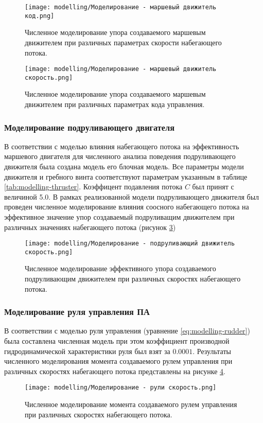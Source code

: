 \begin{figure}[ht]
    \centering
    \texttt{[image: modelling/Моделирование - маршевый движитель код.png]}
    \caption{Численное моделирование упора создаваемого маршевым движителем при различных параметрах скорости набегающего потока.}
    \label{fig:modelling-thruster-velocity}
\end{figure}

\begin{figure}[ht]
    \centering
    \texttt{[image: modelling/Моделирование - маршевый движитель скорость.png]}
    \caption{Численное моделирование упора создаваемого маршевым движителем при различных параметрах кода управления.}
    \label{fig:modelling-thruster-code}
\end{figure}

\subsubsection{Моделирование подруливающего двигателя}
В соответствии с моделью влияния набегающего потока на эффективность маршевого двигателя для численного анализа поведения подруливающего движителя была создана модель его блочная модель.
Все параметры модели движителя и гребного винта соответствуют параметрам указанным в таблице \ref{tab:modelling-thruster}.
Коэффицент подавления потока $C$ был принят с величиной 5.0.
В рамках реализованной модели подруливающего движителя был проведен численное моделирование влияния соосного набегающего потока на эффективное значение упор создаваемый подруливащим движителем при различных значениях набегающего потока (рисунок \ref{fig:modelling-tunnel-velocity})

\begin{figure}[ht]
    \centering
    \texttt{[image: modelling/Моделирование - подруливающий движитель скорость.png]}
    \caption{Численное моделирование эффективного упора создаваемого подруливающим движителем при различных скоростях набегающего потока.}
    \label{fig:modelling-tunnel-velocity}
\end{figure}

\subsubsection{Моделирование руля управления ПА}
В соответствии с моделью руля управления (уравнение \ref{eq:modelling-rudder}) была составлена численная модель при этом коэффициент производной гидродинамической характеристики руля был взят за $0.0001$.
Результаты численного моделирования момента создаваемого рулем управления при различных скоростях набегающего потока представлены на рисунке \ref{fig:modelling-rudder-velocity}.

\begin{figure}[ht]
    \centering
    \texttt{[image: modelling/Моделирование - рули скорость.png]}
    \caption{Численное моделирование момента создаваемого рулем управления при различных скоростях набегающего потока.}
    \label{fig:modelling-rudder-velocity}
\end{figure}